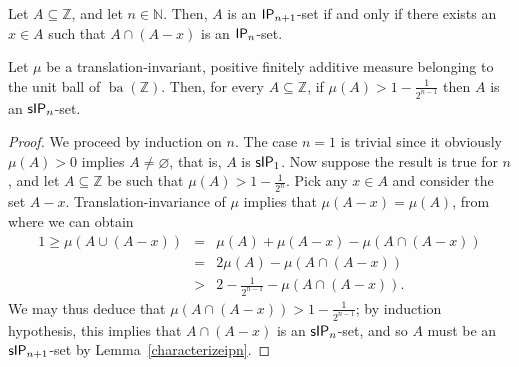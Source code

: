 \documentclass[10pt,a4paper]{amsart}
\newcommand{\ba}{\mathop{\mathrm{ba}}}
\newcommand{\ip}{\mathnormal{\mathsf{IP}}}
\newcommand{\sip}{\mathnormal{\mathsf{sIP}}}
\begin{document}
\begin{prop}\label{characterizeipn}
Let $A\subseteq\mathbb Z$, and let $n\in\mathbb N$. Then, $A$ is an $\ip_{n+1}$-set if and only if there exists an $x\in A$ such that $A\cap(A-x)$ is an $\ip_{n}$-set.
\end{prop}

\begin{thm}\label{translationinvariant}
Let $\mu$ be a translation-invariant, positive finitely additive measure belonging to the unit ball of $\ba(\mathbb Z)$. Then, for every $A\subseteq\mathbb Z$, if $\mu(A)>1-\frac{1}{2^{n-1}}$ then $A$ is an $\sip_{n}$-set.
\end{thm}

\begin{proof}
We proceed by induction on $n$. The case $n=1$ is trivial since it obviously $\mu(A)>0$ implies $A\neq\varnothing$, that is, $A$ is $\sip_1$. Now suppose the result is true for $n$, and let $A\subseteq\mathbb Z$ be such that $\mu(A)>1-\frac{1}{2^n}$. Pick any $x\in A$ and consider the set $A-x$. Translation-invariance of $\mu$ implies that $\mu(A-x)=\mu(A)$, from where we can obtain
\begin{eqnarray*}
    1\geq \mu(A\cup(A-x)) & = & \mu(A)+\mu(A-x)-\mu(A\cap(A-x)) \\
    & = & 2\mu(A)-\mu(A\cap(A-x)) \\
    & > & 2-\frac{1}{2^{n-1}}-\mu(A\cap(A-x)).
\end{eqnarray*}
We may thus deduce that $\mu(A\cap(A-x))>1-\frac{1}{2^{n-1}}$; by induction hypothesis, this implies that $A\cap(A-x)$ is an $\sip_n$-set, and so $A$ must be an $\sip_{n+1}$-set by Lemma~\ref{characterizeipn}.

\end{proof}
\end{document}
